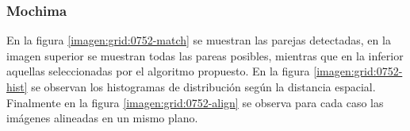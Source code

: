 

	


	
	


\subsubsection*{Mochima}

En la figura \ref{imagen:grid:0752-match} se muestran las parejas detectadas, en la imagen superior se muestran todas las pareas posibles, mientras que en la inferior aquellas seleccionadas por el algoritmo propuesto. En la figura \ref{imagen:grid:0752-hist} se observan los histogramas de distribución según la distancia espacial. Finalmente en la figura \ref{imagen:grid:0752-align} se observa para cada caso las imágenes alineadas en un mismo plano.

